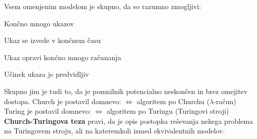 \documentclass[10pt,a4paper,oneside]{book}
\begin{document}
Vsem omenjenim modelom je skupno, da so razumno zmogljivi:
\begin{items}
\item Končno mnogo ukazov
\item Ukaz se izvede v končnem času
\item Ukaz opravi končno mnogo računanja
\item Učinek ukaza je predvidljiv%
\end{items}
Skupno jim je tudi to, da je pomnilnik potencialno neskončen in brez omejitev dostopa.
Church je postavil domnevo:  $\Longleftrightarrow$ algoritem po Churchu ($\lambda$-račun)\\%
Turing je postavil domnevo:  $\Longleftrightarrow$ algoritem po Turingu (Turingovi stroji)
\br
\textbf{Church-Turingova teza} pravi, da je  opis postopka reševanja nekega problema na Turingovem stroju, ali na kateremkoli izmed ekvivalentnih modelov.%

\end{document}
